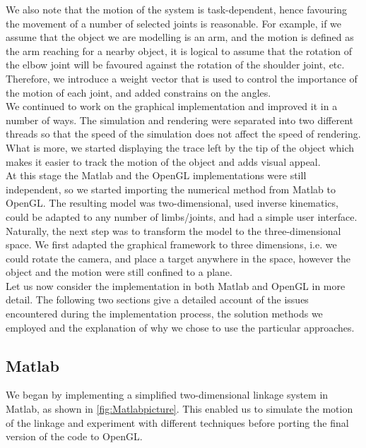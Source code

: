 \documentclass[paper=a4, fontsize=11pt]{scrartcl} %
\numberwithin{equation}{section} %
\numberwithin{figure}{section} %
\numberwithin{table}{section} %
\begin{document}
We also note that the motion of the system is task-dependent, hence favouring the movement of a number of selected joints is reasonable. For example, if we assume that the object we are modelling is an arm, and the motion is defined as the arm reaching for a nearby object, it is logical to assume that the rotation of the elbow joint will be favoured against the rotation of the shoulder joint, etc. Therefore, we introduce a weight vector that is used to control the importance of the motion of each joint, and added constrains on the angles.\\

We continued to work on the graphical implementation and improved it in a number of ways. The simulation and rendering were separated into two different threads so that the speed of the simulation does not affect the speed of rendering. What is more, we started displaying the trace left by the tip of the object which makes it easier to track the motion of the object and adds visual appeal. \\

At this stage the Matlab and the OpenGL implementations were still independent, so we started importing the numerical method from Matlab to OpenGL. The resulting model was two-dimensional, used inverse kinematics, could be adapted to any number of limbs/joints, and had a simple user interface. \\

Naturally, the next step was to transform the model to the three-dimensional space. We first adapted the graphical framework to three dimensions, i.e. we could rotate the camera, and place a target anywhere in the space, however the object and the motion were still confined to a plane. \\

Let us now consider the implementation in both Matlab and OpenGL in more detail. The following two sections give a detailed account of the issues encountered during the implementation process, the solution methods we employed and the explanation of why we chose to use the particular approaches.

\subsection{Matlab}

We began by implementing a simplified two-dimensional linkage system in Matlab, as shown in \ref{fig:Matlabpicture}. This enabled us to simulate the motion of the linkage and experiment with different techniques before porting the final version of the code to OpenGL. \\
\end{document}
